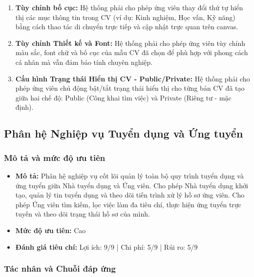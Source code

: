 \begin{enumerate}[label=\bfseries REQ-CV-\arabic*:, leftmargin=2.5cm]
\begin{itemize}
    \end{itemize}
    \item \textbf{Tùy chỉnh bố cục:} Hệ thống phải cho phép ứng viên thay đổi thứ tự hiển thị các mục thông tin trong CV (ví dụ: Kinh nghiệm, Học vấn, Kỹ năng) bằng cách thao tác di chuyển trực tiếp và cập nhật trực quan trên canvas.
    \item \textbf{Tùy chỉnh Thiết kế và Font:} Hệ thống phải cho phép ứng viên tùy chỉnh màu sắc, font chữ và bố cục của mẫu CV đã chọn để phù hợp với phong cách cá nhân mà vẫn đảm bảo tính chuyên nghiệp.
    \item \textbf{Cấu hình Trạng thái Hiển thị CV - Public/Private:} Hệ thống phải cho phép ứng viên chủ động bật/tắt trạng thái hiển thị cho từng bản CV đã tạo giữa hai chế độ: Public (Công khai tìm việc) và Private (Riêng tư - mặc định).
\end{enumerate}

\subsection{Phân hệ Nghiệp vụ Tuyển dụng và Ứng tuyển}

\subsubsection{Mô tả và mức độ ưu tiên}

\begin{itemize}
  \item \textbf{Mô tả:} Phân hệ nghiệp vụ cốt lõi quản lý toàn bộ quy trình tuyển dụng và ứng tuyển giữa Nhà tuyển dụng và Ứng viên. Cho phép Nhà tuyển dụng khởi tạo, quản lý tin tuyển dụng và theo dõi tiến trình xử lý hồ sơ ứng viên. Cho phép Ứng viên tìm kiếm, lọc việc làm đa tiêu chí, thực hiện ứng tuyển trực tuyến và theo dõi trạng thái hồ sơ của mình.
  \item \textbf{Mức độ ưu tiên:} Cao
  \item \textbf{Đánh giá tiêu chí:} Lợi ích: 9/9 | Chi phí: 5/9 | Rủi ro: 5/9
\end{itemize}

\subsubsection{Tác nhân và Chuỗi đáp ứng}

